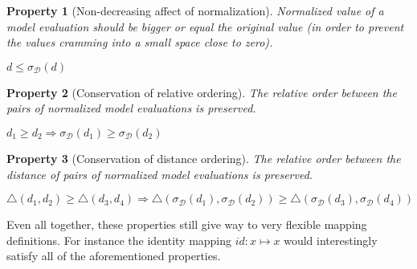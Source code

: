\documentclass{article}
\newtheorem{property}{Property}
\newcommand{\args}{\mathcal{A}} %
\newcommand{\dataset}{\mathcal{D}}   %
\begin{document}
\begin{comment} %
\begin{property}  [Decisiveness of Popular Opinion] Normalized value of a model evaluation is limited by the original argument's social support.
\begin{center}
$ \sigma_{\dataset}(d) \leq \tau(a, \args)$
\end{center}
\end{property}
\end{comment}


\begin{property} [Non-decreasing affect of normalization] Normalized value of a model evaluation should be bigger or equal the original value (in order to prevent the values cramming into a small space close to zero).
\begin{center}
$ d \leq\sigma_{\dataset}(d)$
\end{center}
\end{property}

\begin{property} [Conservation of relative ordering] The relative order between the pairs of normalized model evaluations is preserved.
\begin{center}
 $d_1 \geq d_2 \Longrightarrow \sigma_{\dataset}(d_1) \geq \sigma_{\dataset}(d_2)$\\%
\end{center}
\end{property}

\begin{property} [Conservation of distance ordering] The relative order between the distance of pairs of normalized model evaluations is preserved. 
\label{prop:ConDis}
\begin{center}
 $\bigtriangleup(d_1, d_2) \geq \bigtriangleup(d_3, d_4) \Longrightarrow 
\bigtriangleup(\sigma_{\dataset}(d_1), \sigma_{\dataset}(d_2)) \geq \bigtriangleup(\sigma_{\dataset}(d_3), \sigma_{\dataset}(d_4))$\\%
\end{center}
\end{property}


Even all together, these properties still give way to very flexible mapping definitions. For instance the identity mapping $id: x \mapsto x$ would interestingly satisfy all of the aforementioned properties.
\end{document}
